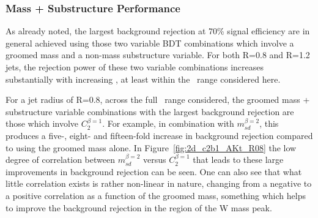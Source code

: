 \subsubsection{Mass + Substructure Performance}

As already noted, the largest background rejection at 70\% signal
efficiency are in general achieved using those two variable BDT combinations
which involve a groomed mass and a non-mass substructure variable. For
both R=0.8 and R=1.2 jets, the rejection power of these two variable
combinations increases substantially with increasing \pt, at least
within the \pt~range considered here.

For a jet radius of R=0.8, across the full \pt~range considered, the
groomed mass + substructure variable combinations with the
largest background rejection are those which
involve $C_2^{\beta=1}$. For example, in combination with
$m_{sd}^{\beta=2}$, this produces a five-, eight- and fifteen-fold
increase in background rejection compared to using the groomed mass
alone. In Figure~\ref{fig:2d_c2b1_AKt_R08} the low degree of
correlation between $m_{sd}^{\beta=2}$ versus $C_2^{\beta=1}$ that
leads to these large improvements in background rejection can be
seen. One can also see that what little correlation exists is rather
non-linear in nature, changing from a negative to a positive
correlation as a function of the groomed mass, something which helps
to improve the background rejection in the region of the W mass peak.

